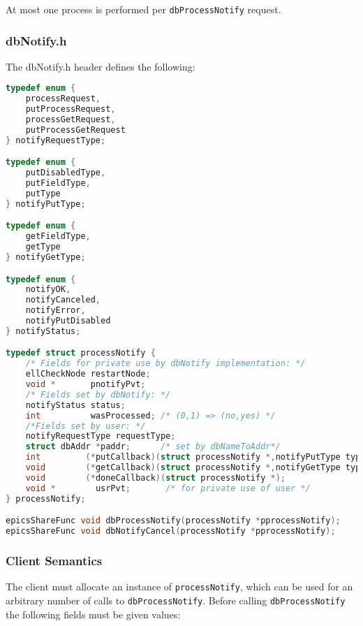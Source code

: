 At most one process is performed per \verb|dbProcessNotify| request.

\subsubsection{dbNotify.h}

The dbNotify.h header defines the following:

\begin{lstlisting}[language=C]
typedef enum {
    processRequest,
    putProcessRequest,
    processGetRequest,
    putProcessGetRequest
} notifyRequestType;

typedef enum {
    putDisabledType,
    putFieldType,
    putType
} notifyPutType;

typedef enum {
    getFieldType,
    getType
} notifyGetType;

typedef enum {
    notifyOK,
    notifyCanceled,
    notifyError,
    notifyPutDisabled
} notifyStatus;

typedef struct processNotify {
    /* Fields for private use by dbNotify implementation: */
    ellCheckNode restartNode;
    void *       pnotifyPvt;
    /* Fields set by dbNotify: */
    notifyStatus status;
    int          wasProcessed; /* (0,1) => (no,yes) */
    /*Fields set by user: */
    notifyRequestType requestType;
    struct dbAddr *paddr;      /* set by dbNameToAddr*/
    int         (*putCallback)(struct processNotify *,notifyPutType type);
    void        (*getCallback)(struct processNotify *,notifyGetType type);
    void        (*doneCallback)(struct processNotify *);
    void *        usrPvt;       /* for private use of user */
} processNotify;

epicsShareFunc void dbProcessNotify(processNotify *pprocessNotify);
epicsShareFunc void dbNotifyCancel(processNotify *pprocessNotify);
\end{lstlisting}

\subsubsection{Client Semantics}

The client must allocate an instance of \verb|processNotify|, which can be used for an arbitrary number of calls to \verb|dbProcessNotify|.
Before calling \verb|dbProcessNotify| the following fields must be given values:

